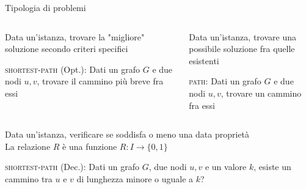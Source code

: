 \begin{frame}{Tipologia di problemi}

\small
\vspace{-15pt}
\begin{columns}[T]
\begin{myboxtitle}
\BI
\item Data un'istanza, trovare la "migliore" soluzione secondo criteri specifici
\item \alert{\textsc{shortest-path} (Opt.)}:
Dati un grafo $G$ e due nodi $u, v$,
trovare il cammino più breve fra essi
\EI
\end{myboxtitle}
\begin{myboxtitle}
\BI
\item Data un'istanza, trovare una possibile soluzione fra quelle esistenti
\item \alert{\textsc{path}}: Dati un grafo $G$ e due nodi $u, v$, trovare un
cammino fra essi
\EI
\end{myboxtitle}
\end{columns}

\begin{myboxtitle}
\BI
\item Data un'istanza, verificare se soddisfa o meno una data proprietà\\
La relazione $R$ è una funzione $R: I \rightarrow \{ 0, 1 \}$ 
\item \alert{\textsc{shortest-path} (Dec.)}: Dati un grafo $G$, due nodi $u,v$  e un valore $k$, esiste un cammino tra $u$ e $v$ di lunghezza minore o uguale a $k$?
\EI
\end{myboxtitle}


\end{frame}

